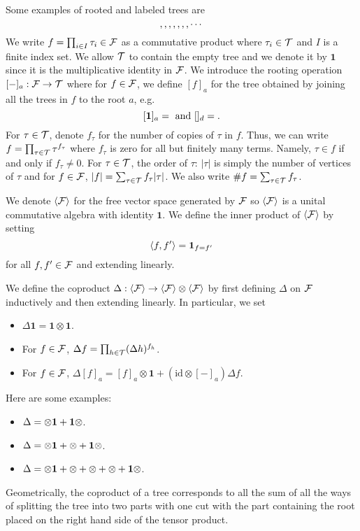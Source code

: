 \documentclass[a4paper, 10pt]{style/preprint}
\begin{document}
Some examples of rooted and labeled trees are 
\[\tree<X>, \tree<1>, \tree<2>, \tree<10>, \tree<3>, \tree<20>, \tree<100>, \cdots\]
We write \(f = \prod_{i \in I} \tau_i \in {\mathcal F}\) as a commutative product where \(\tau_i \in {\mathcal T}\) and \(I\) 
is a finite index set. We allow \({\mathcal T}\) to contain the empty tree and we denote it by \(\mathbf{1}\) 
since it is the multiplicative identity in \({\mathcal F}\). We introduce the rooting operation \([-]_a : {\mathcal F} \to {\mathcal T}\) where 
for \(f \in {\mathcal F}\), we define \([f]_a\) for the tree obtained by joining all the trees in \(f\) to the
root \(a\), e.g. 
\[[\mathbf{1}]_a = \tree<X> \text{ and } [\tree<X> \tree<1cb>]_d = \tree<X10>.\]
For \(\tau \in {\mathcal T}\), denote \(f_\tau\) for the number of copies of \(\tau\) in \(f\). Thus, we can write 
\(f = \prod_{\tau \in {\mathcal T}} \tau^{f_\tau}\)
where \(f_\tau\) is zero for all but finitely many terms. Namely, \(\tau \in f\) if and only if 
\(f_\tau \neq 0\). For \(\tau \in {\mathcal T}\), the order of \(\tau\): \(|\tau|\) is simply the number of vertices of 
\(\tau\) and for \(f \in {\mathcal F}\), \(|f| = \sum_{\tau \in {\mathcal T}} f_\tau |\tau|\). We also write \(\#f = \sum_{\tau \in {\mathcal T}} f_\tau\).

We denote \(\< \CF \>\) for the free vector space generated by \({\mathcal F}\) so \(\< \CF\>\) 
is a unital commutative algebra with identity \(\mathbf{1}\). We define the inner product of \(\< \CF \>\)
by setting 
\begin{equation}\label{eq:inner-product}
  \< f, f'\> = \mathbf{1}_{f = f'}
\end{equation}
for all \(f, f' \in {\mathcal F}\) and extending linearly. 

We define the coproduct \(\Delta : \< \CF \> \to \< \CF \> \otimes \< \CF \>\) 
by first defining \(\Delta\) on \({\mathcal F}\) inductively and then extending linearly. In particular, we set
\begin{itemize}
  \item \(\Delta \mathbf{1} = \mathbf{1} \otimes \mathbf{1}\).
  \item For \(f \in {\mathcal F}\), \(\Delta f = \prod_{h \in {\mathcal T}} (\Delta h)^{f_h}\).
  \item For \(f \in {\mathcal F}\), \(\Delta [f]_a = [f]_a \otimes \mathbf{1} + (\text{id} \otimes [-]_a) \Delta f\).
\end{itemize} 
Here are some examples:
\begin{itemize}
  \item \(\Delta \tree<X> = \tree<X> \otimes \mathbf{1} + \mathbf{1} \otimes \tree<X>\).
  \item \(\Delta \tree<1> = \tree<1> \otimes \mathbf{1} + \tree<Xb> \otimes \tree<X> + \mathbf{1} \otimes \tree<1>\).
  \item \(\Delta \tree<2> = \tree<2> \otimes \mathbf{1} + \tree<Xb> \tree<Xc> \otimes \tree<X> + \tree<Xc> \otimes \tree<1> 
    + \tree<Xb> \otimes \tree<1ac> + \mathbf{1} \otimes \tree<2>\).
\end{itemize}
Geometrically, the coproduct of a tree corresponds to all the sum of all the ways of splitting the tree 
into two parts with one cut with the part containing the root placed on the right hand side of the tensor product.
\end{document}
